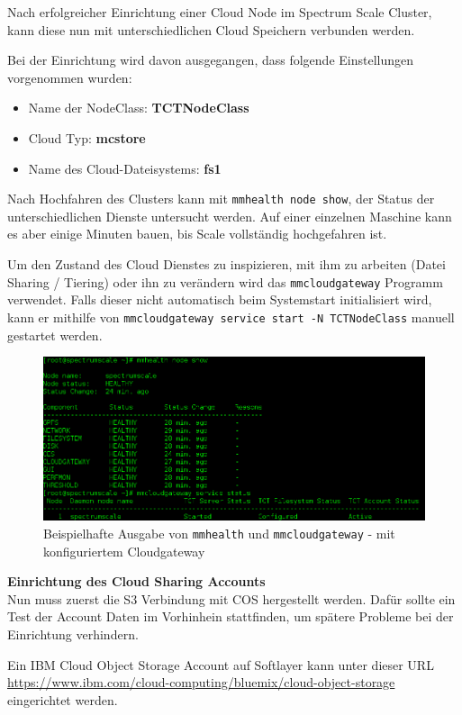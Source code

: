 Nach erfolgreicher Einrichtung einer Cloud Node im Spectrum Scale Cluster, kann diese nun mit unterschiedlichen Cloud Speichern verbunden werden.

Bei der Einrichtung wird davon ausgegangen, dass folgende Einstellungen vorgenommen wurden:
\begin{itemize}
	\item Name der NodeClass: \textbf{TCTNodeClass}
	\item Cloud Typ: \textbf{mcstore}
	\item Name des Cloud-Dateisystems: \textbf{fs1}
\end{itemize}

Nach Hochfahren des Clusters kann mit \lstinline|mmhealth node show|, der Status der unterschiedlichen Dienste untersucht werden. Auf einer einzelnen Maschine kann es aber einige Minuten bauen, bis Scale vollständig hochgefahren ist.

Um den Zustand des Cloud Dienstes zu inspizieren, mit ihm zu arbeiten (Datei Sharing / Tiering) oder ihn zu verändern wird das \lstinline|mmcloudgateway| Programm verwendet. Falls dieser nicht automatisch beim Systemstart initialisiert wird, kann er mithilfe von \lstinline|mmcloudgateway service start -N TCTNodeClass| manuell gestartet werden.

\begin{figure}[hbt]
	\centering
	\includegraphics[scale=0.5]{images/scale-status}
	\caption{Beispielhafte Ausgabe von \lstinline|mmhealth| und \lstinline|mmcloudgateway| - mit konfiguriertem Cloudgateway}
	\label{fig:saclestatus}
\end{figure}


\textbf{Einrichtung des Cloud Sharing Accounts}\\
Nun muss zuerst die S3 Verbindung mit \ac{COS} hergestellt werden. Dafür sollte ein Test der Account Daten im Vorhinhein stattfinden, um spätere Probleme bei der Einrichtung verhindern.

Ein IBM Cloud Object Storage Account auf Softlayer kann unter dieser URL \url{https://www.ibm.com/cloud-computing/bluemix/cloud-object-storage} eingerichtet werden. 

